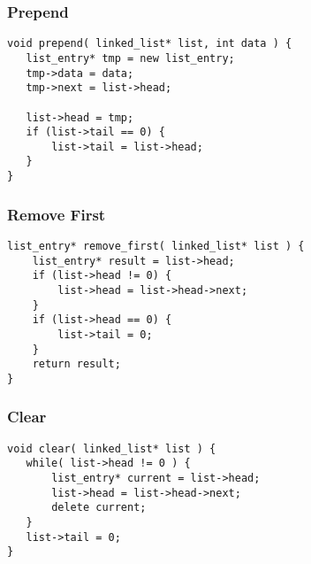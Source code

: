 \begin{frame}[fragile]
\frametitle{Prepend}

\begin{verbatim}
void prepend( linked_list* list, int data ) {
   list_entry* tmp = new list_entry;
   tmp->data = data;
   tmp->next = list->head;
   
   list->head = tmp;
   if (list->tail == 0) {
       list->tail = list->head;
   }
}
\end{verbatim}

\end{frame}

\begin{frame}[fragile]
\frametitle{Remove First}

\begin{verbatim}
list_entry* remove_first( linked_list* list ) {
    list_entry* result = list->head;
    if (list->head != 0) {
        list->head = list->head->next;
    }
    if (list->head == 0) {
        list->tail = 0;
    }
    return result;
}
\end{verbatim}

\end{frame}


\begin{frame}[fragile]
\frametitle{Clear}

\begin{verbatim}
void clear( linked_list* list ) {
   while( list->head != 0 ) {
       list_entry* current = list->head;
       list->head = list->head->next;
       delete current;	
   }
   list->tail = 0;
}
\end{verbatim}

\end{frame}




